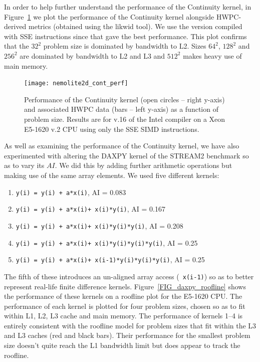 \documentclass[12pt]{article}
\begin{document}
In order to help further understand the performance of the Continuity
kernel, in Figure~\ref{FIG_cont_perf} we plot the performance of the
Continuity kernel alongside HWPC-derived metrics (obtained using the
likwid tool). We use the version compiled with SSE instructions since
that gave the best performance. This plot confirms that the $32^2$
problem size is dominated by bandwidth to L2. Sizes $64^2$, $128^2$
and $256^2$ are dominated by bandwidth to L2 and L3 and $512^2$ makes
heavy use of main memory.

\begin{figure}
  \centering
  \texttt{[image: nemolite2d\_cont\_perf]}
  \caption{Performance of the Continuity kernel (open circles -- right y-axis)
    and associated HWPC data (bars -- left y-axis) as a function of
    problem size. Results are for v.16 of the Intel compiler on a Xeon
    E5-1620 v.2 CPU using only the SSE SIMD instructions.}
  \label{FIG_cont_perf}
\end{figure}

As well as examining the performance of the Continuity kernel, we have
also experimented with altering the DAXPY kernel of the STREAM2
benchmark so as to vary its $AI$. We did this by adding further
arithmetic operations but making use of the same array
elements. We used five different kernels:
\begin{enumerate}
\item {\tt y(i) = y(i) + a*x(i)}, AI = 0.083
\item {\tt y(i) = y(i) + a*x(i)+ x(i)*y(i)}, AI = 0.167
\item {\tt y(i) = y(i) + a*x(i)+ x(i)*y(i)*y(i)}, AI = 0.208
\item {\tt y(i) = y(i) + a*x(i)+ x(i)*y(i)*y(i)*y(i)}, AI = 0.25
\item {\tt y(i) = y(i) + a*x(i)+ x(i-1)*y(i)*y(i)*y(i)}, AI = 0.25
\end{enumerate}
The fifth of these introduces an un-aligned array access ({\tt
  x(i-1)}) so as to better represent real-life finite difference
kernels.  Figure~\ref{FIG_daxpy_roofline} shows the performance of
these kernels on a roofline plot for the E5-1620 CPU. The performance
of each kernel is plotted for four problem sizes, chosen so as to fit
within L1, L2, L3 cache and main memory. The performance of kernels
1--4 is entirely consistent with the roofline model for problem sizes
that fit within the L3 and L3 caches (red and black bars). Their
performance for the smallest problem size doesn't quite reach the L1
bandwidth limit but does appear to track the roofline.
\end{document}

